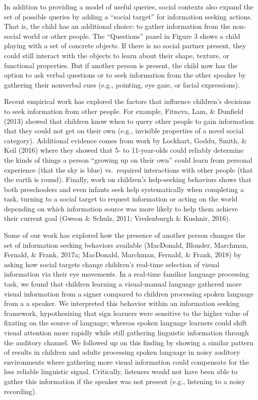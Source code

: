 \documentclass[oneside]{report}
\begin{document}
In addition to providing a model of useful queries, social contexts also
expand the set of possible queries by adding a ``social target'' for
information seeking actions. That is, the child has an additional
choice: to gather information from the non-social world or other people.
The ``Questions'' panel in Figure 3 shows a child playing with a set of
concrete objects. If there is no social partner present, they could
still interact with the objects to learn about their shape, texture, or
functional properties. But if another person is present, the child now
has the option to ask verbal questions or to seek information from the
other speaker by gathering their nonverbal cues (e.g., pointing, eye
gaze, or facial expressions).

Recent empirical work has explored the factors that influence children's
decisions to seek information from other people. For example, Fitneva,
Lam, \& Dunfield (2013) showed that children know when to query other
people to gain information that they could not get on their own (e.g.,
invisible properties of a novel social category). Additional evidence
comes from work by Lockhart, Goddu, Smith, \& Keil (2016) where they
showed that 5- to 11-year-olds could reliably determine the kinds of
things a person ``growing up on their own'' could learn from personal
experience (that the sky is blue) vs.~required interactions with other
people (that the earth is round). Finally, work on children's
help-seeking behaviors shows that both preschoolers and even infants
seek help systematically when completing a task, turning to a social
target to request information or acting on the world depending on which
information source was more likely to help them achieve their current
goal (Gweon \& Schulz, 2011; Vredenburgh \& Kushnir, 2016).

Some of our work has explored how the presence of another person changes
the set of information seeking behaviors available (MacDonald, Blonder,
Marchman, Fernald, \& Frank, 2017a; MacDonald, Marchman, Fernald, \&
Frank, 2018) by asking how social targets change children's real-time
selection of visual information via their eye movements. In a real-time
familiar language processing task, we found that children learning a
visual-manual language gathered more visual information from a signer
compared to children processing spoken language from a a speaker. We
interpreted this behavior within an information seeking framework,
hypothesizing that sign learners were sensitive to the higher value of
fixating on the source of language; whereas spoken language learners
could shift visual attention more rapidly while still gathering
linguistic information through the auditory channel. We followed up on
this finding by showing a similar pattern of results in children and
adults processing spoken language in noisy auditory environments where
gathering more visual information could compensate for the less reliable
linguistic signal. Critically, listeners would not have been able to
gather this information if the speaker was not present (e.g., listening
to a noisy recording).
\end{document}
